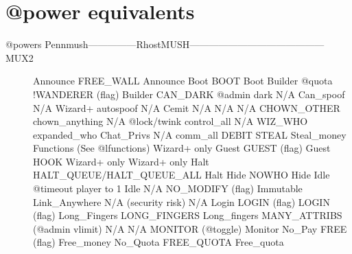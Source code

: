 \documentclass[letterpaper,10pt,english]{sphinxmanual}
\begin{document}
\section{@power equivalents}
\label{\detokenize{differences:power-equivalents}}\begin{description}
\item[{@powers Pennmush—————\sphinxhyphen{}RhostMUSH——————————————MUX2}] \leavevmode
\sphinxAtStartPar
Announce                FREE\_WALL                                          Announce
Boot                    BOOT                                               Boot
Builder                 @quota !WANDERER (flag)                            Builder
CAN\_DARK                @admin  dark                   N/A
Can\_spoof               N/A \sphinxhyphen{} Wizard+ auto\sphinxhyphen{}spoof                           N/A
Cemit                   N/A                                                N/A
N/A                     CHOWN\_OTHER                                        chown\_anything
N/A                     @lock/twink                                        control\_all
N/A                     WIZ\_WHO                                            expanded\_who
Chat\_Privs              N/A                                                comm\_all
DEBIT                   STEAL                                              Steal\_money
Functions               (See @lfunctions)                                  Wizard+ only
Guest                   GUEST (flag)                                       Guest
HOOK                    Wizard+ only                                       Wizard+ only
Halt                    HALT\_QUEUE/HALT\_QUEUE\_ALL                          Halt
Hide                    NOWHO                                              Hide
Idle                    @timeout player to \sphinxhyphen{}1                              Idle
N/A                     NO\_MODIFY (flag)                                   Immutable
Link\_Anywhere           N/A (security risk)                                N/A
Login                   LOGIN (flag)                                       LOGIN (flag)
Long\_Fingers            LONG\_FINGERS                                       Long\_fingers
MANY\_ATTRIBS            (@admin vlimit)                                    N/A
N/A                     MONITOR (@toggle)                                  Monitor
No\_Pay                  FREE (flag)                                        Free\_money
No\_Quota                FREE\_QUOTA                                         Free\_quota

\end{description}
\end{document}
